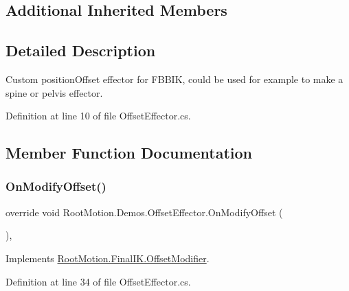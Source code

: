 \subsection*{Additional Inherited Members}


\subsection{Detailed Description}
Custom position\+Offset effector for F\+B\+B\+IK, could be used for example to make a spine or pelvis effector. 



Definition at line 10 of file Offset\+Effector.\+cs.



\subsection{Member Function Documentation}
\mbox{\label{class_root_motion_1_1_demos_1_1_offset_effector_ac832df1522c8056a353e3506ef3348dc}} 
\subsubsection{\texorpdfstring{On\+Modify\+Offset()}{OnModifyOffset()}}
{\footnotesize\ttfamily override void Root\+Motion.\+Demos.\+Offset\+Effector.\+On\+Modify\+Offset (\begin{DoxyParamCaption}{ }\end{DoxyParamCaption})\hspace{0.3cm}{\ttfamily [protected]}, {\ttfamily [virtual]}}



Implements \mbox{\hyperlink{class_root_motion_1_1_final_i_k_1_1_offset_modifier_a777e9ffb4afca3d8647959a79a1120bb}{Root\+Motion.\+Final\+I\+K.\+Offset\+Modifier}}.



Definition at line 34 of file Offset\+Effector.\+cs.

\mbox{\label{class_root_motion_1_1_demos_1_1_offset_effector_adf550db6cfb59e9b14f0bb0e464d82bd}} 
